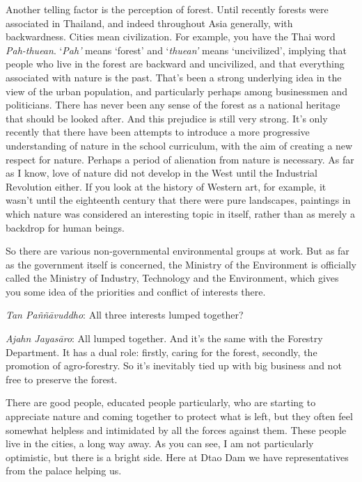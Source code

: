 Another telling factor is the perception of forest. Until recently
forests were associated in Thailand, and indeed throughout Asia
generally, with backwardness. Cities mean civilization. For example, you
have the Thai word \emph{Pah-thuean}. `\emph{Pah'} means `forest' and
`\emph{thuean'} means `uncivilized', implying that people who live in
the forest are backward and uncivilized, and that everything associated
with nature is the past. That's been a strong underlying idea in the
view of the urban population, and particularly perhaps among businessmen
and politicians. There has never been any sense of the forest as a
national heritage that should be looked after. And this prejudice is
still very strong. It's only recently that there have been attempts to
introduce a more progressive understanding of nature in the school
curriculum, with the aim of creating a new respect for nature. Perhaps a
period of alienation from nature is necessary. As far as I know, love of
nature did not develop in the West until the Industrial Revolution
either. If you look at the history of Western art, for example, it
wasn't until the eighteenth century that there were pure landscapes,
paintings in which nature was considered an interesting topic in itself,
rather than as merely a backdrop for human beings.

So there are various non-governmental environmental groups at work. But
as far as the government itself is concerned, the Ministry of the
Environment is officially called the Ministry of Industry, Technology
and the Environment, which gives you some idea of the priorities and
conflict of interests there.

\emph{Tan Paññāvuddho}‎: All three interests lumped together?

\emph{Ajahn Jayasāro‎}: All lumped together. And it's the same with the
Forestry Department. It has a dual role: firstly, caring for the forest,
secondly, the promotion of agro-forestry. So it's inevitably tied up
with big business and not free to preserve the forest.

There are good people, educated people particularly, who are starting to
appreciate nature and coming together to protect what is left, but they
often feel somewhat helpless and intimidated by all the forces against
them. These people live in the cities, a long way away. As you can see,
I am not particularly optimistic, but there is a bright side. Here at
Dtao Dam we have representatives from the palace helping us.

